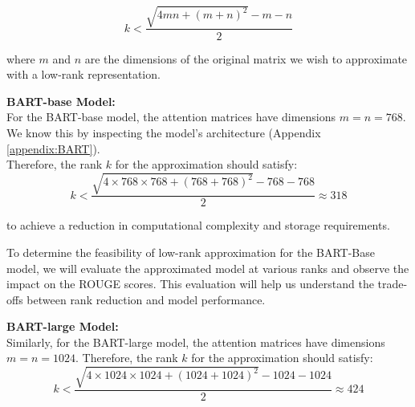             \[
            k < \frac{\sqrt{4mn + (m+n)^2} - m - n}{2}
            \]
            
            where \(m\) and \(n\) are the dimensions of the original matrix we wish to approximate with a low-rank representation.
            
            \textbf{BART-base Model:}\\
            For the BART-base model, the attention matrices have dimensions \(m = n = 768\). We know this by inspecting the model's architecture (Appendix \ref{appendix:BART}).\\
            Therefore, the rank \(k\) for the approximation should satisfy:
            \[
            k < \frac{\sqrt{4 \times 768 \times 768 + (768 + 768)^2} - 768 - 768}{2} \approx 318
            \]
            
            \label{appropriate_rank}to achieve a reduction in computational complexity and storage requirements.
            
            To determine the feasibility of low-rank approximation for the BART-Base model, we will evaluate the approximated model at various ranks and observe the impact on the ROUGE scores. This evaluation will help us understand the trade-offs between rank reduction and model performance.
            

            \textbf{BART-large Model:}\\
            Similarly, for the BART-large model, the attention matrices have dimensions \(m = n = 1024\). Therefore, the rank \(k\) for the approximation should satisfy:
            \[
            k < \frac{\sqrt{4 \times 1024 \times 1024 + (1024 + 1024)^2} - 1024 - 1024}{2} \approx 424
            \]


        
        
